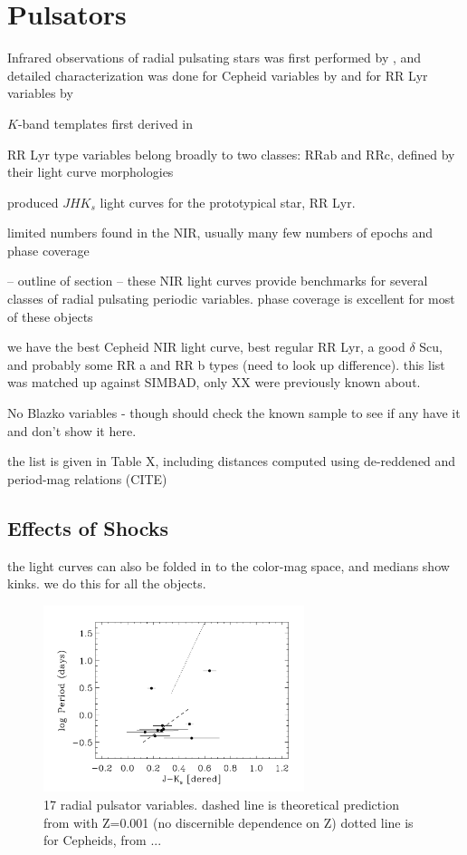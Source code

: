 \documentclass[]{emulateapj}
\begin{document}
\clearpage


\section{Pulsators}
Infrared observations of radial pulsating stars was first performed by \cite{wisniewski1968}, and detailed characterization was done for Cepheid variables by \cite{mcgonegal1982} and for RR Lyr variables by \cite{longmore1985}

$K$-band templates first derived in \citet{jones1996}

RR Lyr type variables belong broadly to two classes: RRab and RRc, defined by their light curve morphologies \citep{bailey1902}

\citet{sollima2008} produced $JHK_s$ light curves for the prototypical star, RR Lyr.

limited numbers found in the NIR, usually many few numbers of epochs and phase coverage \citep[e.g.][]{delprincipe2005}


-- outline of section --
these NIR light curves provide benchmarks for several classes of radial pulsating periodic variables. phase coverage is excellent for most of these objects

we have the best Cepheid NIR light curve, best regular RR Lyr, a good $\delta$ Scu, and probably some RR a and RR b types (need to look up difference). this list was matched up against SIMBAD, only XX were previously known about.

No Blazko variables - though should check the known sample to see if any have it and don't show it here.

the list is given in Table X, including distances computed using de-reddened and period-mag relations (CITE)

\subsection{Effects of Shocks}
the light curves can also be folded in to the color-mag space, and medians show kinks. we do this for all the objects.



\begin{figure}[]
\centering
\includegraphics[width=3.0in]{new_plots/color_period_rr}
\caption{17 radial pulsator variables. dashed line is theoretical prediction from \citet{catelan2004} with Z=0.001 (no discernible dependence on Z) dotted line is for Cepheids, from ...}
\label{rr_color_period}
\end{figure}
\end{document}
